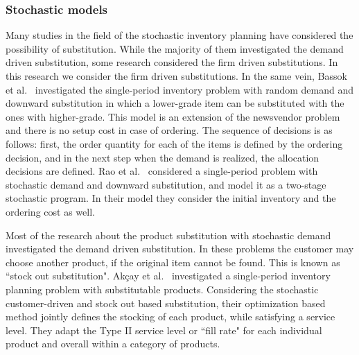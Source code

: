 \documentclass[10pt]{article}
\begin{document}
\subsubsection{Stochastic models}
Many studies in the field of the stochastic inventory planning have considered the possibility of substitution. While the majority of them investigated the demand driven substitution, some research considered the firm driven substitutions. In this research we consider the firm driven substitutions. In the same vein, Bassok et al.~\cite{bassok1999single} investigated the single-period inventory problem with random demand and downward substitution in which a lower-grade item can be substituted with the ones with higher-grade. This model is an extension of the newsvendor problem and there is no setup cost in case of ordering. The sequence of decisions is as follows: first, the order quantity for each of the items is defined by the ordering decision, and in the next step when the demand is realized, the allocation decisions are defined. Rao et al.~\cite{rao2004multi} considered a single-period problem with stochastic demand and downward substitution, and model it as a two-stage stochastic program. In their model they consider the initial inventory and the ordering cost as well. 

Most of the research about the  product substitution with stochastic demand investigated the demand driven substitution. In these problems the customer may choose another product, if the original item cannot be found. This is known as ``stock out substitution". Akçay et al.~\cite{akccaycategory} investigated a single-period inventory planning problem with substitutable products. Considering the stochastic customer-driven and stock out based substitution, their optimization based method jointly defines the stocking of each product, while satisfying a service level. They adapt the Type II service level or ``fill rate" for each individual product and overall within a category of products.  
\end{document}
